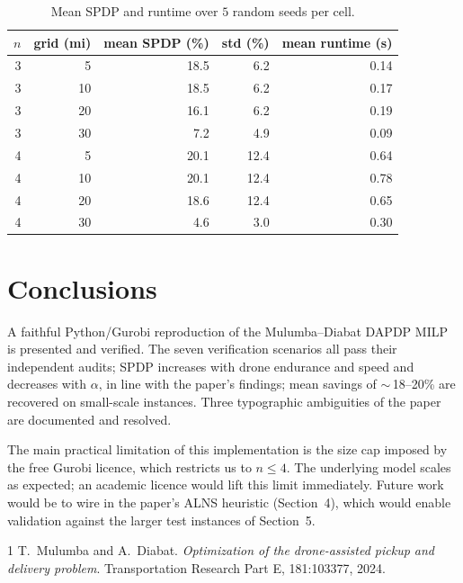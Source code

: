 \documentclass[11pt,a4paper]{article}
\newcommand{\dapdp}{\textsc{DAPDP}}
\begin{document}
\begin{table}[h]
\centering
\caption{Mean SPDP and runtime over $5$ random seeds per cell.}
\label{tab:validation}
\small
\begin{tabular}{@{}rrrrr@{}}
\toprule
$n$ & grid (mi) & mean SPDP (\%) & std (\%) & mean runtime (s) \\
\midrule
3 &  5 & 18.5 & 6.2 & 0.14 \\
3 & 10 & 18.5 & 6.2 & 0.17 \\
3 & 20 & 16.1 & 6.2 & 0.19 \\
3 & 30 &  7.2 & 4.9 & 0.09 \\
4 &  5 & 20.1 & 12.4 & 0.64 \\
4 & 10 & 20.1 & 12.4 & 0.78 \\
4 & 20 & 18.6 & 12.4 & 0.65 \\
4 & 30 &  4.6 & 3.0 & 0.30 \\
\bottomrule
\end{tabular}
\end{table}

\section{Conclusions}

A faithful Python/Gurobi reproduction of the Mulumba--Diabat \dapdp{} MILP
is presented and verified. The seven verification scenarios all pass
their independent audits; SPDP increases with drone endurance and speed
and decreases with $\alpha$, in line with the paper's findings; mean
savings of $\sim$\,18--20\% are recovered on small-scale instances. Three
typographic ambiguities of the paper are documented and resolved.

The main practical limitation of this implementation is the size cap
imposed by the free Gurobi licence, which restricts us to $n\le 4$. The
underlying model scales as expected; an academic licence would lift this
limit immediately. Future work would be to wire in the paper's ALNS
heuristic (Section~4), which would enable validation against the larger
test instances of Section~5.

\begin{thebibliography}{1}
T.~Mulumba and A.~Diabat. \emph{Optimization of the drone-assisted pickup
and delivery problem}. Transportation Research Part E, 181:103377, 2024.
\end{thebibliography}
\end{document}
